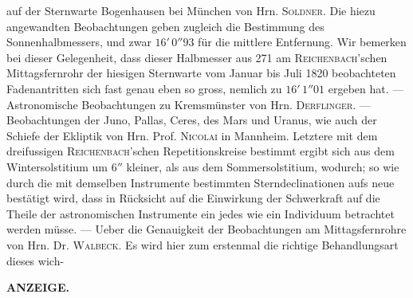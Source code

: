 auf der Sternwarte Bogenhausen bei München von Hrn. \textsc{Soldner}. Die hiezu angewandten Beobachtungen geben zugleich die Bestimmung des Sonnenhalbmessers, und zwar $16'\,0''93$ für die mittlere Entfernung. Wir bemerken bei dieser Gelegenheit, dass dieser Halbmesser aus 271 am \textsc{Reichenbach}'schen Mittagsfernrohr der hiesigen Sternwarte vom Januar bis Juli 1820 beobachteten Fadenantritten sich fast genau eben so gross, nemlich zu $16'\,1''01$ ergeben hat. --- Astronomische Beobachtungen zu Kremsmünster von Hrn. \textsc{Derflinger}. --- Beobachtungen der Juno, Pallas, Ceres, des Mars und Uranus, wie auch der Schiefe der Ekliptik von Hrn. Prof. \textsc{Nicolai} in Mannheim. Letztere mit dem dreifussigen \textsc{Reichenbach}'schen Repetitionskreise bestimmt ergibt sich aus dem Wintersolstitium um $6''$ kleiner, als aus dem Sommersolstitium, wodurch; so wie durch die mit demselben Instrumente bestimmten Sterndeclinationen aufs neue bestätigt wird, dass in Rücksicht auf die Einwirkung der Schwerkraft auf die Theile der astronomischen Instrumente ein jedes wie ein Individuum betrachtet werden müsse. --- Ueber die Genauigkeit der Beobachtungen am Mittagsfernrohre von Hrn. Dr. \textsc{Walbeck}. Es wird hier zum erstenmal die richtige Behandlungsart dieses wich-\par
\clearpage
{}
\noindent{}%
\parbox[b]{\dimexpr\textwidth-20mm\relax}{\centering\small\textbf{ANZEIGE.}}%
\makebox[10mm][r]{}\par\nobreak\medskip
